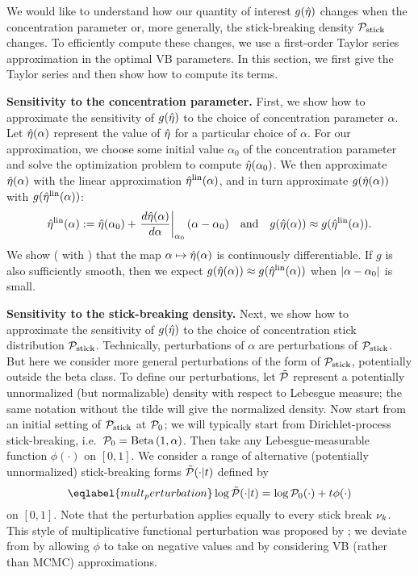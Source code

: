 We would like to understand how our quantity of interest $g(\hat\eta)$
changes when the concentration parameter or, more generally, the stick-breaking
density $\mathcal{P}_{\mathrm{stick}}$ changes. To efficiently compute these changes, we use
a first-order Taylor series approximation in the optimal VB parameters. In this section, we first give the Taylor series and then show how to compute its terms.

\noindent \textbf{Sensitivity to the concentration parameter.}
First, we show how to approximate the sensitivity of $g(\hat\eta)$ to the choice of concentration
parameter $\alpha$. Let $\hat\eta(\alpha)$ represent the value of $\hat\eta$ for a particular choice of $\alpha$. For our approximation, we choose some initial value
$\alpha_0$ of the concentration parameter and solve the optimization problem to
compute $\hat\eta(\alpha_0)$. We then approximate $\hat\eta(\alpha)$ with the linear approximation $\hat\eta^{\mathrm{lin}}(\alpha)$, and in turn approximate $g(\hat\eta(\alpha))$ with $g(\hat\eta^{\mathrm{lin}}(\alpha))$:
%
\begin{align*}
%
\etalin(\alpha) :=
    \etaopt(\alpha_0) +
    \fracat{d\etaopt(\alpha)}{d\alpha}{\alpha_0} (\alpha - \alpha_0)
\mathand
g(\etaopt(\alpha)) \approx g(\etalin(\alpha)).
%
\end{align*}
%
We show ( with ) that the map $\alpha \mapsto \hat\eta(\alpha)$ is continuously differentiable. If $g$ is also sufficiently smooth, then
we expect $g(\hat\eta(\alpha)) \approx g(\hat\eta^{\mathrm{lin}}(\alpha))$ when $\left|\alpha -
\alpha_0\right|$ is small.

\noindent \textbf{Sensitivity to the stick-breaking density.}
Next, we show how to approximate the sensitivity of $g(\hat\eta)$ to the choice of concentration
stick distribution $\mathcal{P}_{\mathrm{stick}}$. Technically, perturbations of $\alpha$ are perturbations of $\mathcal{P}_{\mathrm{stick}}$. But here we consider more general perturbations of the form of $\mathcal{P}_{\mathrm{stick}}$, potentially outside the beta class. To define our perturbations, let $\tilde{\mathcal{P}}$ represent a potentially unnormalized (but normalizable) density with respect to Lebesgue measure; the same notation without the tilde will give the normalized density.
Now start from an initial setting of $\mathcal{P}_{\mathrm{stick}}$ at $\mathcal{P}_{0}$; we will typically start from Dirichlet-process stick-breaking, i.e.\ $\mathcal{P}_{0} = \mathrm{Beta}\left(1,\alpha\right)$. Then take any Lebesgue-measurable function $\phi(\cdot)$ on $[0,1]$. We consider a range of alternative (potentially unnormalized) stick-breaking forms $\tilde{\mathcal{P}}(\cdot \vert t)$ defined by
%
\begin{equation} \eqlabel{mult_perturbation}
	\log \ptil(\cdot \vert \t) = \log \pbase(\cdot) + \t \phi(\cdot)
\end{equation}
%
on $[0,1]$. Note that the perturbation applies equally to every stick break $\nu_{k}$. This style of multiplicative functional perturbation was proposed by \citet{gustafson:1996:local}; we deviate from \citet{gustafson:1996:local} by allowing $\phi$ to take on negative values and by considering VB (rather than MCMC) approximations.

